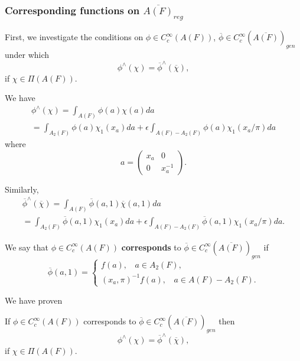 \subsubsection{Corresponding functions on $\overline{A(F)}_{reg}$}

First, we investigate the conditions on
$\phi \in C_c^\infty(A(F))$,
$\overline{\phi}
\in C_c^\infty(\overline{A(F)})_{gen}$
under which
\[
\phi^{\wedge}(\chi)=
\overline{\phi}^{\wedge}(\overline{\chi}),
\]
if $\chi \in \Pi(A(F))$.

We have
\begin{equation}
\begin{array}{c}
\phi^{\wedge}(\chi)=
\int_{A(F)}\phi(a)\chi(a) da\\
=\int_{A_2(F)}\phi(a)\chi_1(x_a) da +
\epsilon \int_{A(F)-A_2(F)}\phi(a)\chi_1(x_a/\pi) da
\end{array}
\end{equation}
where
\[
a=\left(
\begin{array}{cc}
x_a & 0\\
0 & x_a^{-1}
\end{array}
\right).
\]

Similarly, 
\begin{equation}
\begin{array}{c}
\overline{\phi}^{\wedge}(\overline{\chi})=
\int_{A(F)}\overline{\phi}(a,1)\overline{\chi}(a,1) da\\
=\int_{A_2(F)}\overline{\phi}(a,1)\chi_1(x_a) da +
\epsilon \int_{A(F)-A_2(F)}\overline{\phi}(a,1)\chi_1(x_a/\pi) da.
\end{array}
\end{equation}

\begin{definition} We say that
$\phi \in C_c^\infty(A(F))$ {\bf corresponds} to
$\overline{\phi}
\in C_c^\infty(\overline{A(F)})_{gen}$
if
\[
\overline{\phi}(a,1)=
\left\{
\begin{array}{c}
f(a),\ \ \ \ a\in A_2(F),\\
(x_a,\pi)^{-1}f(a),\ \ \ \ a\in A(F)-A_2(F).
\end{array}
\right.
\]
\end{definition}

We have proven

\begin{lemma} If
$\phi \in C_c^\infty(A(F))$ corresponds to
$\overline{\phi}\in C_c^\infty(\overline{A(F)})_{gen}$
then
\[
\phi^{\wedge}(\chi)=
\overline{\phi}^{\wedge}(\overline{\chi}),
\]
if $\chi \in \Pi(A(F))$.
\end{lemma}

